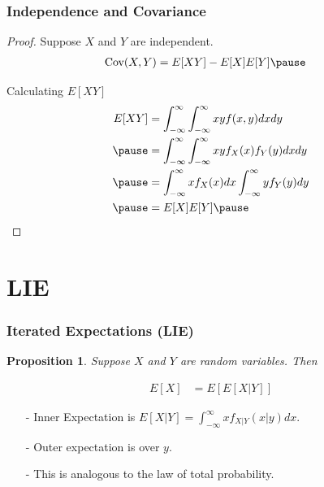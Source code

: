 \documentclass[aspectratio=169, handout]{beamer}
\newtheorem{prop}{Proposition}
\numberwithin{equation}{section}
\begin{document}
\begin{frame}
\frametitle{Independence and Covariance}
\begin{small}
\begin{proof}
Suppose $X$ and $Y$ are independent.  \pause 
\begin{align*}
\text{Cov}(X, Y) &= E[XY] - E[X]E[Y]   \pause 
\end{align*}

Calculating $E[XY]$ \pause 
\begin{align*}
E[XY] &= \int_{-\infty}^{\infty} \int_{-\infty}^{\infty} x y f(x,y)dxdy  \\ \pause 
& = \int_{-\infty}^{\infty} \int_{-\infty}^{\infty} x y f_{X}(x) f_{Y}(y)dxdy  \\ \pause 
&= \int_{-\infty}^{\infty} x f_{X}(x) dx \int_{-\infty}^{\infty} y f_{Y}(y) dy  \\ \pause 
&= E[X] E[Y]  \pause 
\end{align*}


\end{proof}

\end{small}
\end{frame}


\section{LIE}

\begin{frame}
\frametitle{Iterated Expectations (LIE)}

\begin{prop}
Suppose $X$ and $Y$ are random variables.  Then 

\begin{align*}
E[X] &= E[E[X|Y]]  
\end{align*}


\end{prop}


\begin{itemize}
\item[-] Inner Expectation is $E[X|Y] = \int_{-\infty}^{\infty} x f_{X|Y} (x|y) dx$.  
\item[-] Outer expectation is over $y$.  
\item[-] This is analogous to the law of total probability.
\end{itemize}


\end{frame}
\end{document}
